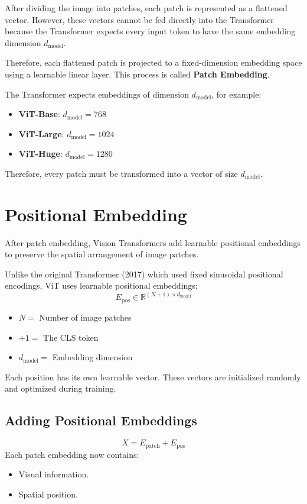 After dividing the image into patches, each patch is represented as a flattened vector. However, these vectors cannot be fed directly into the Transformer because the Transformer expects every input token to have the same embedding dimension $d_{\text{model}}$.

Therefore, each flattened patch is projected to a fixed-dimension embedding space using a learnable linear layer. This process is called \textbf{Patch Embedding}.

The Transformer expects embeddings of dimension $d_{\text{model}}$, for example:
\begin{itemize}
    \item \textbf{ViT-Base}: $d_{\text{model}} = 768$
    \item \textbf{ViT-Large}: $d_{\text{model}} = 1024$
    \item \textbf{ViT-Huge}: $d_{\text{model}} = 1280$
\end{itemize}

Therefore, every patch must be transformed into a vector of size $d_{\text{model}}$.


\section{Positional Embedding}

After patch embedding, Vision Transformers add learnable positional embeddings to preserve the spatial arrangement of image patches.

Unlike the original Transformer (2017) which used fixed sinusoidal positional encodings, ViT uses learnable positional embeddings:
\[
E_{\text{pos}} \in \mathbb{R}^{(N+1) \times d_{\text{model}}}
\]
\begin{itemize}
    \item $N =$ Number of image patches
    \item $+1 =$ The CLS token
    \item $d_{\text{model}} =$ Embedding dimension
\end{itemize}

Each position has its own learnable vector. These vectors are initialized randomly and optimized during training.

\subsection{Adding Positional Embeddings}
\[
X = E_{\text{patch}} + E_{\text{pos}}
\]
Each patch embedding now contains:
\begin{itemize}
    \item Visual information.
    \item Spatial position.
\end{itemize}


